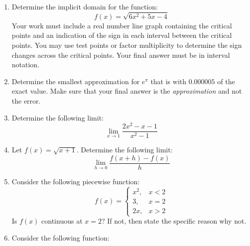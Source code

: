\documentclass[letterpaper,12pt,fleqn]{article}
\begin{document}
\begin{enumerate}[left=0pt,itemsep=0.5in]
  \bigskip

\item Determine the implicit domain for the function:
  \[f(x)=\sqrt{6x^2+5x-4}\]
  Your work must include a real number line graph containing the critical points and an indication of the sign in
  each interval between the critical points.  You may use test points or factor multiplicity to determine the sign
  changes across the critical points.  Your final answer must be in interval notation.

\item Determine the smallest approximation for \(e^{\pi}\) that is with \(0.000005\) of the exact value.  Make sure
  that your final answer is the \emph{approximation} and not the error.

\item Determine the following limit:
  \[\lim_{x\to1}\frac{2x^2-x-1}{x^2-1}\]

\item Let \(f(x)=\sqrt{x+1}\).  Determine the following limit:
  \[\lim_{h\to0}\frac{f(x+h)-f(x)}{h}\]

\item Consider the following piecewise function:
  \[f(x)=\begin{cases}
  x^2, & x<2 \\
  3, & x=2 \\
  2x, & x>2
  \end{cases}\]
  Is \(f(x)\) continuous at \(x=2\)?  If not, then state the specific reason why not.

\item Consider the following function:

  \bigskip

  \begin{center}
  \end{center}


\end{enumerate}
\end{document}

